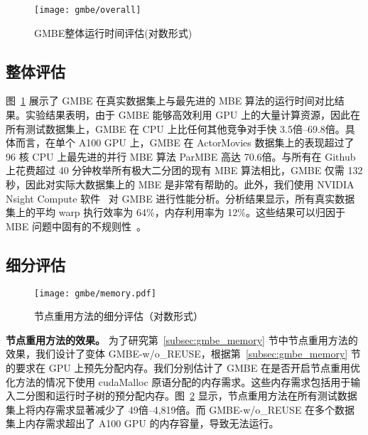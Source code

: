 \begin{figure} [t]
  \center
    \vspace{0.1in}
		\texttt{[image: gmbe/overall]}
	\caption{GMBE整体运行时间评估(对数形式)}
	\label{fig:gmbe_exp_overall}
\end{figure}


\subsection{整体评估}

图~\ref{fig:gmbe_exp_overall} 展示了 GMBE 在真实数据集上与最先进的 MBE 算法的运行时间对比结果。实验结果表明，由于 GMBE 能够高效利用 GPU 上的大量计算资源，因此在所有测试数据集上，GMBE 在 CPU 上比任何其他竞争对手快 3.5倍--69.8倍。具体而言，在单个 A100 GPU 上，GMBE 在 ActorMovies 数据集上的表现超过了 96 核 CPU 上最先进的并行 MBE 算法 ParMBE 高达 70.6倍。与所有在 Github 上花费超过 40 分钟枚举所有极大二分团的现有 MBE 算法相比，GMBE 仅需 132 秒，因此对实际大数据集上的 MBE 是非常有帮助的。此外，我们使用 NVIDIA Nsight Compute 软件~\cite{Nsight} 对 GMBE 进行性能分析。分析结果显示，所有真实数据集上的平均 warp 执行效率为 64\%，内存利用率为 12\%。这些结果可以归因于 MBE 问题中固有的不规则性~\cite{Irregularity12}。

\subsection{细分评估}
\label{subsec:gmbe_breakdown}

\begin{figure} [t]
	\centering
  \vspace{0.1in}
	\texttt{[image: gmbe/memory.pdf]}	
	\vspace{0.1in}
  \caption{节点重用方法的细分评估（对数形式）}
	\label{fig:gmbe_exp_memory}
\end{figure}

\textbf{节点重用方法的效果。} 为了研究第~\ref{subsec:gmbe_memory} 节中节点重用方法的效果，我们设计了变体 GMBE-w/o\_REUSE，根据第~\ref{subsec:gmbe_memory} 节的要求在 GPU 上预先分配内存。我们分别估计了 GMBE 在是否开启节点重用优化方法的情况下使用 \textsf{cudaMalloc} 原语分配的内存需求。这些内存需求包括用于输入二分图和运行时子树的预分配内存。图~\ref{fig:gmbe_exp_memory} 显示，节点重用方法在所有测试数据集上将内存需求显著减少了 49倍--4,819倍。而 GMBE-w/o\_REUSE 在多个数据集上内存需求超出了 A100 GPU 的内存容量，导致无法运行。

